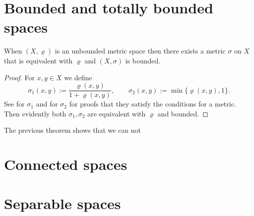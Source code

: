\section{Bounded and totally bounded spaces}

\begin{theorem} \label{th:xieqxi0}
When $(X,\varrho)$ is an unbounded metric space then there exists a metric $\sigma$ on $X$ that is equivalent with $\varrho$ and $(X,\sigma)$ is bounded.
\end{theorem}
\begin{proof}
For $x,y\in X$ we define
\[
	\sigma_1(x,y):=\frac{\varrho(x,y)}{1+\varrho(x,y)},\qquad\sigma_2(x,y):=\min\{\varrho(x,y), 1\}.
\]
See \cite[p.~22]{copson88} for $\sigma_1$ and \cite[p.~250]{engelking89} for $\sigma_2$ for proofs that they satisfy the conditions for a metric. Then evidently both $\sigma_1, \sigma_2$ are equivalent with $\varrho$ and bounded.
\end{proof}

The previous theorem shows that we can not \tbd


\section{Connected spaces}

\section{Separable spaces}
